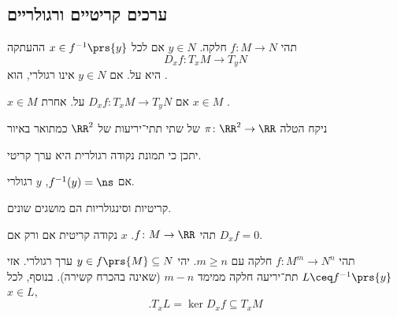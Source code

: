 \documentclass[a4paper,10pt,twoside,openany]{book}
\begin{document}
\subsection{ערכים קריטיים ורגולריים}
\begin{definition}
תהי
$f \colon M \to N$
חלקה.
$y \in N$
אם לכל
$x \in f^{-1}\prs{y}$
ההעתקה
\[D_xf \colon T_x M \to T_y N\]
היא על.
אם
$y \in N$
אינו רגולרי, הוא
.
\end{definition}
\begin{definition}
$x \in M$
אם
$D_x f \colon T_x M \to T_y N$
על.
אחרת
$x \in M$
.
\end{definition}
\begin{example}
ניקח הטלה
$\pi \colon \RR^2 \to \RR$
של שתי תתי־יריעות של
$\RR^2$
כמתואר באיור
\end{example}
\begin{remark}
יתכן כי תמונת נקודה רגולרית היא ערך קריטי.
\end{remark}
\begin{remark}
אם
$f^{-1}(y) = \ns$,
$y$
רגולרי.
\end{remark}
\begin{remark}
קריטיות וסינגולריות הם מושגים שונים.
\end{remark}
\begin{example}
תהי
$f \colon M \to \RR$.
$x$
נקודה קריטית אם ורק אם
$D_x f = 0$.
\end{example}
\begin{theorem}
תהי
$f \colon M^m \to N^n$
חלקה עם
$m \geq n$.
יהי
$y \in f\prs{M} \subseteq N$
ערך רגולרי.
אזי
$L \ceq f^{-1}\prs{y}$
תת־יריעה חלקה ממימד
$m-n$
(שאינה בהכרח קשירה).
בנוסף, לכל
$x \in L$,
\[\text{.} T_x L = \ker D_x f \subseteq T_x M\]
\end{theorem}
\end{document}
